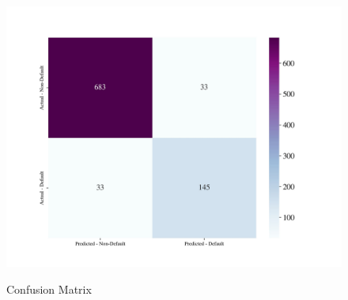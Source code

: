 \begin{figure}[H]
    \centering
    \caption{Confusion Matrix}\vspace{0.5em}
    \label{fig:confmat}\
    \includegraphics[width=140mm]{Figures/Confusion_Matrix.jpg}
    \vspace{-1em}
\end{figure}


